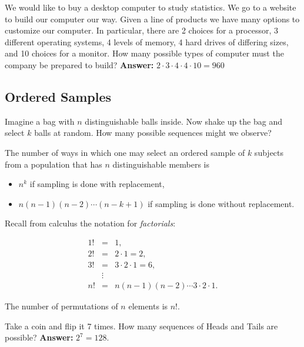 \documentclass[captions=tableheading]{scrbook}
\begin{document}
\begin{example}
We would like to buy a desktop computer to study statistics. We go to a website to build our computer our way. Given a line of products we have many options to customize our computer. In particular, there are 2 choices for a processor, 3 different operating systems, 4 levels of memory, 4 hard drives of differing sizes, and 10 choices for a monitor. How many possible types of computer must the company be prepared to build? \textbf{Answer:} \(2\cdot3\cdot4\cdot4\cdot10=960\)
\end{example}
\subsection{Ordered Samples}
\label{sec-4-5-1}


Imagine a bag with \(n\) distinguishable balls inside. Now shake up the bag and select \(k\) balls at random. How many possible sequences might we observe?

\begin{prop}
The number of ways in which one may select an ordered sample of \(k\) subjects from a population that has \(n\) distinguishable members is

\begin{itemize}
\item \(n^{k}\) if sampling is done with replacement,
\item \(n(n-1)(n-2)\cdots(n-k+1)\) if sampling is done without replacement.
\end{itemize}

\end{prop}

Recall from calculus the notation for \emph{factorials}: 

\begin{eqnarray*}
1! & = & 1,\\
2! & = & 2\cdot1=2,\\
3! & = & 3\cdot2\cdot1=6,\\
 & \vdots\\
n! & = & n(n-1)(n-2)\cdots3\cdot2\cdot1.
\end{eqnarray*}

\begin{fact}
The number of permutations of \(n\) elements is \(n!\).
\end{fact}

\begin{example}
Take a coin and flip it 7 times. How many sequences of Heads and Tails are possible? \textbf{Answer:} \(2^{7}=128\).
\end{example}
\end{document}
